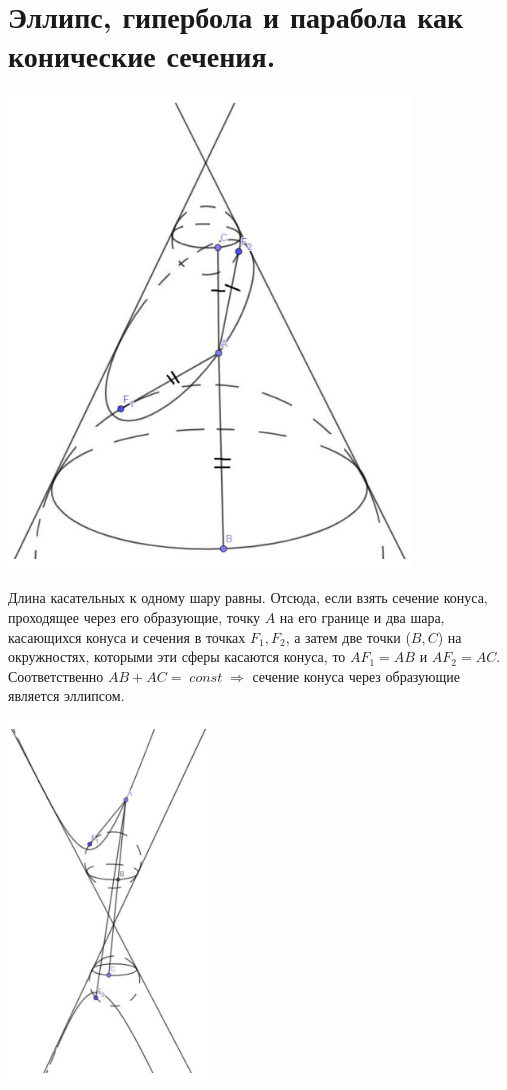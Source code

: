 \documentclass[12pt]{article}
\DeclareMathOperator{\const}{\textit{const}}
\begin{document}
\begin{sloppypar}
    \section{Эллипс, гипербола и парабола как конические сечения.}
    \includegraphics[width=0.8\textwidth]{graphics/Конус_эллипс.png}

    Длина касательных к одному шару равны. Отсюда, если взять сечение конуса, проходящее через его образующие, точку $A$ на его границе и два шара, касающихся конуса и сечения в точках $F_1, F_2$, а затем две точки ($B, C$) на окружностях, которыми эти сферы касаются конуса, то $AF_1 = AB$ и $AF_2 = AC$. Соответственно $AB + AC = \const \Rightarrow$ сечение конуса через образующие является эллипсом.

    \includegraphics[width=0.4\textwidth]{graphics/Конус_гипербола.png}


\end{sloppypar}
\end{document}
